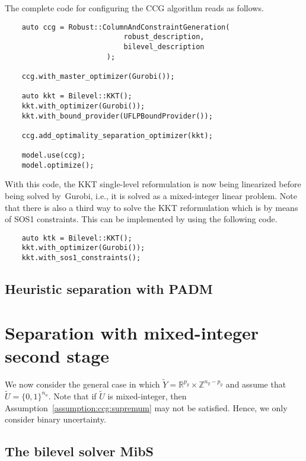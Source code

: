 The complete code for configuring the CCG algorithm reads as follows.
\begin{lstlisting}
    auto ccg = Robust::ColumnAndConstraintGeneration(
                            robust_description,
                            bilevel_description
                        );
    
    ccg.with_master_optimizer(Gurobi());

    auto kkt = Bilevel::KKT();
    kkt.with_optimizer(Gurobi());
    kkt.with_bound_provider(UFLPBoundProvider());

    ccg.add_optimality_separation_optimizer(kkt);

    model.use(ccg);
    model.optimize();
\end{lstlisting}

With this code, the KKT single-level reformulation is now being linearized
before being solved by~\textsf{Gurobi}, i.e., it is solved as a mixed-integer
linear problem. Note that there is also a third way to solve the KKT
reformulation which is by means of SOS1 constraints. This can be implemented
by using the following code.
%
\begin{lstlisting}
    auto ktk = Bilevel::KKT();
    kkt.with_optimizer(Gurobi());
    kkt.with_sos1_constraints();   
\end{lstlisting}

\subsection{Heuristic separation with PADM}


\section{Separation with mixed-integer second stage}

We now consider the general case in which $\tilde{Y} =
\mathbb{R}^{p_y}\times\mathbb{Z}^{n_y - p_y}$ and assume that $\tilde{U} =
\{0,1\}^{n_u}$. Note that if $\tilde{U}$ is mixed-integer, then
Assumption~\ref{assumption:ccg:supremum} may not be satisfied. Hence, we only
consider binary uncertainty.

\subsection{The bilevel solver \textsf{MibS}}

\textcite{Tahernejad2020}

